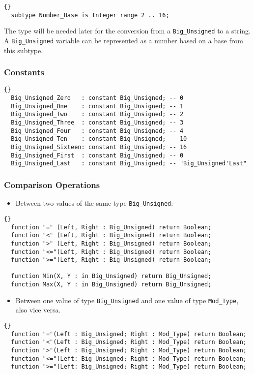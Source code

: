 \hhline
\begin{lstlisting}{}
  subtype Number_Base is Integer range 2 .. 16;
\end{lstlisting}
The type will be needed later for the conversion from a
\texttt{Big\_Unsigned} to a string. A \texttt{Big\_Unsigned} variable
can be represented as a number based on a base from this
subtype.

\hhline
\subsubsection*{Constants}
\begin{lstlisting}{}
  Big_Unsigned_Zero   : constant Big_Unsigned; -- 0
  Big_Unsigned_One    : constant Big_Unsigned; -- 1
  Big_Unsigned_Two    : constant Big_Unsigned; -- 2
  Big_Unsigned_Three  : constant Big_Unsigned; -- 3
  Big_Unsigned_Four   : constant Big_Unsigned; -- 4
  Big_Unsigned_Ten    : constant Big_Unsigned; -- 10
  Big_Unsigned_Sixteen: constant Big_Unsigned; -- 16
  Big_Unsigned_First  : constant Big_Unsigned; -- 0
  Big_Unsigned_Last   : constant Big_Unsigned; -- "Big_Unsigned'Last"
\end{lstlisting}

\subsubsection*{Comparison Operations}
\begin{itemize}
\item Between two values of the same type \texttt{Big\_Unsigned}:
\end{itemize}
\begin{lstlisting}{}
  function "=" (Left, Right : Big_Unsigned) return Boolean;
  function "<" (Left, Right : Big_Unsigned) return Boolean;
  function ">" (Left, Right : Big_Unsigned) return Boolean;
  function "<="(Left, Right : Big_Unsigned) return Boolean;
  function ">="(Left, Right : Big_Unsigned) return Boolean;

  function Min(X, Y : in Big_Unsigned) return Big_Unsigned;
  function Max(X, Y : in Big_Unsigned) return Big_Unsigned;
\end{lstlisting}
\begin{itemize}
\item Between one value of type \texttt{Big\_Unsigned} and one value
  of type \texttt{Mod\_Type}, also vice versa.
\end{itemize}
\begin{lstlisting}{}
  function "="(Left : Big_Unsigned; Right : Mod_Type) return Boolean;
  function "<"(Left : Big_Unsigned; Right : Mod_Type) return Boolean;
  function ">"(Left : Big_Unsigned; Right : Mod_Type) return Boolean;
  function "<="(Left: Big_Unsigned; Right : Mod_Type) return Boolean;
  function ">="(Left: Big_Unsigned; Right : Mod_Type) return Boolean;
\end{lstlisting}
